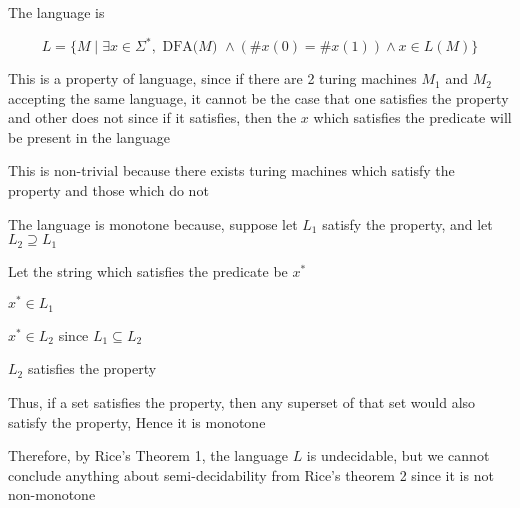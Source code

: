 The language is 

$$
L = \{
    M \mid \exists x \in \Sigma^*, \text{ DFA($M$) } \land
    (\#x(0) = \#x(1)) \land x \in L(M)
\}
$$

This is a property of language, since if there are 2 turing machines $M_1$ and $M_2$ accepting the same language, it cannot be the case that one satisfies the property and other does not since if it satisfies, then the $x$ which satisfies the predicate will be present in the language 

This is non-trivial because there exists turing machines which satisfy the property and those which do not

The language is monotone because, suppose let $L_1$ satisfy the property, and let $L_2 \supseteq L_1$

Let the string which satisfies the predicate be $x^*$

$x^* \in L_1$

\imp
$x^* \in L_2$ since $L_1 \subseteq L_2$

\imp
$L_2$ satisfies the property


Thus, if a set satisfies the property, then any superset of that set would also satisfy the property, Hence it is monotone

Therefore, by Rice's Theorem 1, the language $L$ is undecidable, but we cannot conclude anything about semi-decidability from Rice's theorem 2 since it is not non-monotone





















